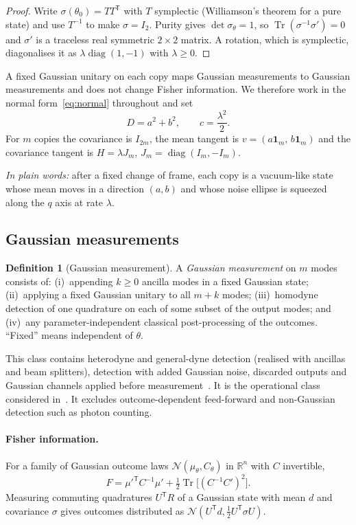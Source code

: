 \documentclass[11pt,a4paper]{article}
\theoremstyle{definition}\newtheorem{definition}{Definition}
\theoremstyle{remark}\newtheorem{remark}{Remark}
\newcommand{\R}{\mathbb R}
\newcommand{\tr}{\operatorname{Tr}}
\newcommand{\diag}{\operatorname{diag}}
\newcommand{\one}{\mathbf 1}
\newcommand{\takeaway}[1]{\par\smallskip\noindent\textit{In plain words:} #1\par\smallskip}
\begin{document}
\begin{proof}
Write $\sigma(\theta_0)=TT^{\mathsf T}$ with $T$ symplectic (Williamson's theorem for a pure state) and use $T^{-1}$ to make $\sigma=I_2$. Purity gives $\det\sigma_\theta=1$, so $\tr(\sigma^{-1}\sigma')=0$ and $\sigma'$ is a traceless real symmetric $2\times2$ matrix. A rotation, which is symplectic, diagonalises it as $\lambda\diag(1,-1)$ with $\lambda\ge0$.
\end{proof}

A fixed Gaussian unitary on each copy maps Gaussian measurements to Gaussian measurements and does not change Fisher information. We therefore work in the normal form~\eqref{eq:normal} throughout and set
\[
D=a^2+b^2,\qquad c=\frac{\lambda^2}{2}.
\]
For $m$ copies the covariance is $I_{2m}$, the mean tangent is $v=(a\one_m,\,b\one_m)$ and the covariance tangent is $H=\lambda J_m$, $J_m=\diag(I_m,-I_m)$.

\takeaway{after a fixed change of frame, each copy is a vacuum-like state whose mean moves in a direction $(a,b)$ and whose noise ellipse is squeezed along the $q$ axis at rate $\lambda$.}

\subsection{Gaussian measurements}

\begin{definition}[Gaussian measurement]\label{def:gauss}
A \emph{Gaussian measurement} on $m$ modes consists of: (i)~appending $k\ge0$ ancilla modes in a fixed Gaussian state; (ii)~applying a fixed Gaussian unitary to all $m+k$ modes; (iii)~homodyne detection of one quadrature on each of some subset of the output modes; and (iv)~any parameter-independent classical post-processing of the outcomes. ``Fixed'' means independent of $\theta$.
\end{definition}

This class contains heterodyne and general-dyne detection (realised with ancillas and beam splitters), detection with added Gaussian noise, discarded outputs and Gaussian channels applied before measurement~\cite{Serafini2017,Giedke2002}. It is the operational class considered in~\cite{Navarro2025,Cenni2022}. It excludes outcome-dependent feed-forward and non-Gaussian detection such as photon counting.

\paragraph{Fisher information.} For a family of Gaussian outcome laws $\mathcal N(\mu_\theta,C_\theta)$ in $\R^n$ with $C$ invertible,
\begin{equation}\label{eq:gaussFI}
F=\mu'^{\mathsf T}C^{-1}\mu'+\tfrac12\tr\!\big[(C^{-1}C')^2\big].
\end{equation}
Measuring commuting quadratures $U^{\mathsf T}R$ of a Gaussian state with mean $d$ and covariance $\sigma$ gives outcomes distributed as $\mathcal N(U^{\mathsf T}d,\tfrac12U^{\mathsf T}\sigma U)$.
\end{document}
